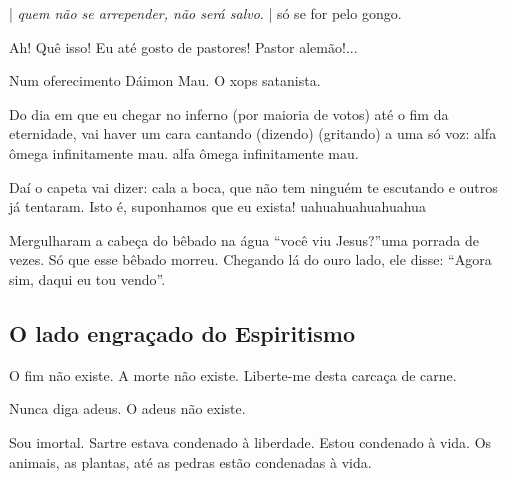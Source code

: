 \documentclass[12pt,a4paper]{article}
\begin{document}
		\begin{flushright}
		\end{flushright}

| \emph{quem n\~ao se arrepender, n\~ao ser\'a salvo}.
| s\'o se for pelo gongo.

		\begin{flushright}
		\end{flushright}

Ah! Qu\^e isso! Eu at\'e gosto de pastores! Pastor alem\~ao!...

		\begin{flushright}
		\end{flushright}

Num oferecimento D\'aimon Mau. O xops satanista.

		\begin{flushright}
		\end{flushright}

Do dia em que eu chegar no inferno (por maioria de votos) at\'e o fim da
eternidade, vai haver um cara cantando (dizendo) (gritando) a uma s\'o
voz: alfa \^omega infinitamente mau. alfa \^omega infinitamente mau.

Da\'i o capeta vai dizer: cala a boca, que n\~ao tem ningu\'em te escutando e
outros j\'a tentaram. Isto \'e, suponhamos que eu exista! uahuahuahuahuahua

		\begin{flushright}
		\end{flushright}

Mergulharam a cabe\c{c}a do b\^ebado na \'agua \textquotedblleft voc\^e viu Jesus?\textquotedblright uma porrada de vezes. S\'o que esse b\^ebado morreu. Chegando l\'a do ouro lado, ele disse: \textquotedblleft Agora sim, daqui eu tou vendo\textquotedblright.

	\subsection{O lado engra\c{c}ado do Espiritismo}
		\begin{flushright}
		\end{flushright}

		O fim n\~ao existe. A morte n\~ao existe. Liberte-me desta carca\c{c}a de carne.

		Nunca diga adeus. O adeus n\~ao existe.

		Sou imortal. Sartre estava condenado \`a liberdade. Estou condenado \`a vida. Os animais, as plantas, at\'e as pedras est\~ao condenadas \`a vida.
\end{document}
